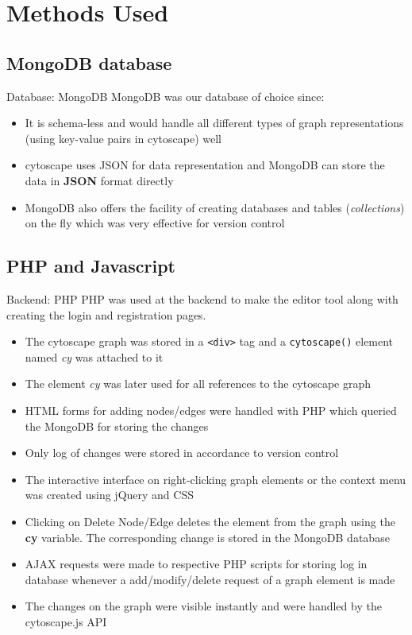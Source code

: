 \documentclass{beamer}
\begin{document}
\section{Methods Used}
\subsection{MongoDB database}
\begin{frame}{Database: MongoDB}
MongoDB \cite{database} was our database of choice since:
\begin{itemize}
\item It is schema-less and would handle all different types of graph representations (using key-value pairs in cytoscape) well
\item cytoscape uses JSON for data representation and MongoDB can store the data in \textbf{JSON} format directly
\item MongoDB also offers the facility of creating databases and tables (\emph{collections}) on the fly which was very effective for version control
\end{itemize}
\end{frame}

\subsection{PHP and Javascript}
\begin{frame}[allowframebreaks]{Backend: PHP}
PHP was used at the backend to make the editor tool along with creating the login and registration pages.

\begin{itemize}
\item The cytoscape graph was stored in a \texttt{<div>} tag and a \texttt{cytoscape()} element named \emph{cy} was attached to it
\item The element \emph{cy} was later used for all references to the cytoscape graph
\item HTML forms for adding nodes/edges were handled with PHP which queried the MongoDB for storing the changes
\item Only log of changes were stored in accordance to version control
\item The interactive interface on right-clicking graph elements or the context menu \cite{context_menu} was created using jQuery and CSS 
\item Clicking on Delete Node/Edge deletes the element from the graph using the \textbf{cy} variable. The corresponding change is stored in the MongoDB database
\item AJAX requests were made to respective PHP scripts for storing log in database whenever a add/modify/delete request of a graph element is made
\item The changes on the graph were visible instantly and were handled by the cytoscape.js API \cite{cytoscape_API}
\end{itemize}

\end{frame}
\end{document}

